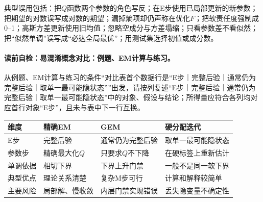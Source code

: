 \begin{warningbox}
典型误用包括：把$Q$函数两个参数的角色写反；在E步使用已局部更新的新参数；把期望的对数误写成对数的期望；漏掉熵项却仍声称在优化$F$；把软责任度强制成0--1；高斯方差更新使用旧均值；忽略空成分与方差塌缩；只看参数差不看似然；把“似然单调”误写成“必达全局最优”；用测试集选择初值或成分数。
\end{warningbox}

\label{struct:V3-C04-CH31}
\paragraph{读前自检：易混淆概念对比：例题、EM计算与练习。}从例题、EM计算与练习的条件“对比表首个数据行是“E步｜完整后验｜通常仍为完整后验｜取单一最可能隐状态””出发，请按列复述“E步｜完整后验｜通常仍为完整后验｜取单一最可能隐状态”中的对象、假设与结论；所得量应符合各列均对应首行对象“E步”，且未与表中下一行互换。\par

\begin{comparisonbox}
\par\medskip
\small
\begin{tabularx}{\linewidth}{@{}>{\raggedright\arraybackslash}p{2.0cm} >{\raggedright\arraybackslash}X >{\raggedright\arraybackslash}X >{\raggedright\arraybackslash}X@{}}
\toprule 维度 & 精确EM & GEM & 硬分配迭代\\ \midrule
E步 & 完整后验 & 通常仍为完整后验 & 取单一最可能隐状态\\
参数步 & 精确最大化$Q$ & 只要求$Q$不下降 & 在硬标签上重新估计\\
单调依据 & 相切下界 & 下界上升门禁 & 一般不是同一软下界\\
典型优点 & 理论关系清楚 & 复杂M步可行 & 计算和解释较简单\\
主要风险 & 局部解、慢收敛 & 内层门禁实现错误 & 丢失隐变量不确定性\\
\bottomrule
\end{tabularx}
\end{comparisonbox}

